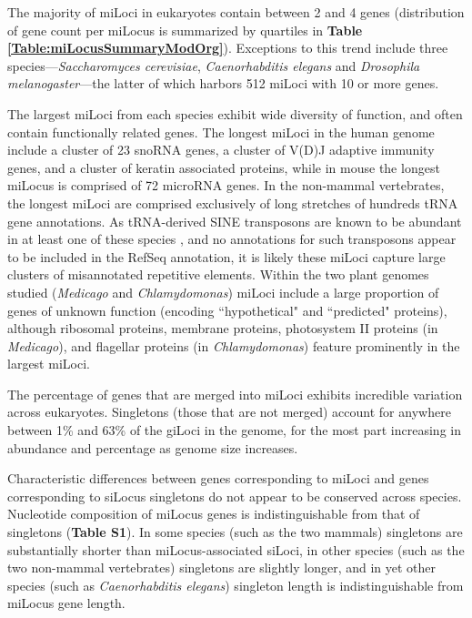 The majority of miLoci in eukaryotes contain between 2 and 4 genes (distribution of gene count per miLocus is summarized by quartiles in \textbf{Table \ref{Table:miLocusSummaryModOrg}}).
Exceptions to this trend include three species---\textit{Saccharomyces cerevisiae}, \textit{Caenorhabditis elegans} and \textit{Drosophila melanogaster}---the latter of which harbors 512 miLoci with 10 or more genes.

The largest miLoci from each species exhibit wide diversity of function, and often contain functionally related genes.
The longest miLoci in the human genome include a cluster of 23 snoRNA genes, a cluster of V(D)J adaptive immunity genes, and a cluster of keratin associated proteins, while in mouse the longest miLocus is comprised of 72 microRNA genes.
In the non-mammal vertebrates, the longest miLoci are comprised exclusively of long stretches of hundreds tRNA gene annotations.
As tRNA-derived SINE transposons are known to be abundant in at least one of these species \cite{DrerGenome}, and no annotations for such transposons appear to be included in the RefSeq annotation, it is likely these miLoci capture large clusters of misannotated repetitive elements.
Within the two plant genomes studied (\textit{Medicago} and \textit{Chlamydomonas}) miLoci include a large proportion of genes of unknown function (encoding ``hypothetical" and ``predicted" proteins), although ribosomal proteins, membrane proteins, photosystem II proteins (in \textit{Medicago}), and flagellar proteins (in \textit{Chlamydomonas}) feature prominently in the largest miLoci.

The percentage of genes that are merged into miLoci exhibits incredible variation across eukaryotes.
Singletons (those that are not merged) account for anywhere between 1\% and 63\% of the giLoci in the genome, for the most part increasing in abundance and percentage as genome size increases.

Characteristic differences between genes corresponding to miLoci and genes corresponding to siLocus singletons do not appear to be conserved across species.
Nucleotide composition of miLocus genes is indistinguishable from that of singletons (\textbf{Table S1}).
In some species (such as the two mammals) singletons are substantially shorter than miLocus-associated siLoci, in other species (such as the two non-mammal vertebrates) singletons are slightly longer, and in yet other species (such as \textit{Caenorhabditis elegans}) singleton length is indistinguishable from miLocus gene length.

